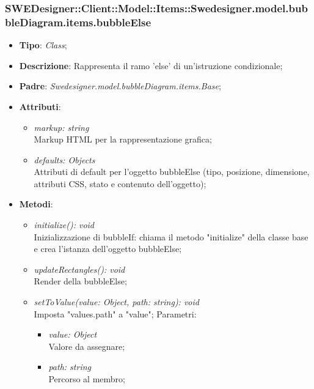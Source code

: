 \documentclass[../DefinizioneDiProdotto.tex]{subfiles}
\begin{document}
			\subsubsection{SWEDesigner::Client::Model::Items::Swedesigner.model.bubbleDiagram.items.bubbleElse}
			\hypertarget{SWEDesigner::Client::Model::Items::Swedesigner.model.bubbleDiagram.items.bubbleElse}{}
			\begin{itemize}
				\item \textbf{Tipo}: \emph{Class};
				\item \textbf{Descrizione}: Rappresenta il ramo 'else' di un'istruzione condizionale;
				\item \textbf{Padre}: \emph{Swedesigner.model.bubbleDiagram.items.Base};
				\item \textbf{Attributi}:
				\begin{itemize}
					\item \emph{markup: string}\\
					Markup HTML per la rappresentazione grafica;
					\item \emph{defaults: Objects}\\
					Attributi di default per l'oggetto bubbleElse (tipo, posizione, dimensione, attributi CSS, stato e contenuto dell'oggetto);
				\end{itemize}
				\item \textbf{Metodi}:
				\begin{itemize}
					\item \emph{initialize(): void}\\
					Inizializzazione di bubbleIf: chiama il metodo "initialize" della classe base e crea l'istanza dell'oggetto bubbleElse;
					\item \emph{updateRectangles(): void}\\
					Render della bubbleElse;
					\item \emph{setToValue(value: Object, path: string): void}\\
					Imposta "values.path" a "value";
					Parametri:
					\begin{itemize}
						\item \emph{value: Object} \\
						Valore da assegnare;
						\item \emph{path: string} \\
						Percorso al membro;
					\end{itemize}
				\end{itemize}
			\end{itemize}
			
\end{document}
